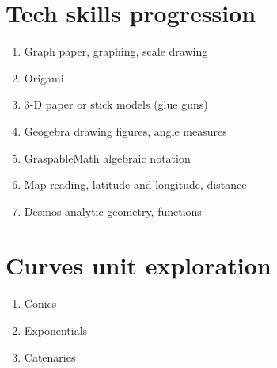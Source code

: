 \documentclass[12pt, twoside]{article}
\begin{document}
\section*{Tech skills progression}
\begin{enumerate}
  \item Graph paper, graphing, scale drawing
  \item Origami
  \item 3-D paper or stick models (glue guns)
  \item Geogebra drawing figures, angle measures
  \item GraspableMath algebraic notation
  \item Map reading, latitude and longitude, distance
  \item Desmos analytic geometry, functions
\end{enumerate}

\section*{Curves unit exploration}
\begin{enumerate}
  \item Conics
  \item Exponentials
  \item Catenaries
\end{enumerate}
\end{document}
